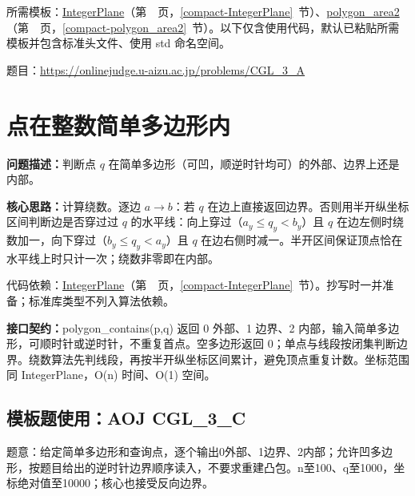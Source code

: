 所需模板：\hyperref[compact-IntegerPlane]{IntegerPlane}（第~\pageref{compact-IntegerPlane}~页，\ref{compact-IntegerPlane}~节）、\hyperref[compact-polygon_area2]{polygon\_\allowbreak{}area2}（第~\pageref{compact-polygon_area2}~页，\ref{compact-polygon_area2}~节）。以下仅含使用代码，默认已粘贴所需模板并包含标准头文件、使用 std 命名空间。

题目：\url{https://onlinejudge.u-aizu.ac.jp/problems/CGL_3_A}



\Needspace{500pt}

\section{点在整数简单多边形内}\label{compact-polygon_contains}

\noindent\textbf{问题描述：}\allowbreak 判断点 $q$ 在简单多边形（可凹，顺逆时针均可）的外部、边界上还是内部。

\textbf{核心思路：}\allowbreak 计算绕数。逐边 $a\to b$：若 $q$ 在边上直接返回边界。否则用半开纵坐标区间判断边是否穿过过 $q$ 的水平线：向上穿过（$a_y\le q_y<b_y$）且 $q$ 在边左侧时绕数加一，向下穿过（$b_y\le q_y<a_y$）且 $q$ 在边右侧时减一。半开区间保证顶点恰在水平线上时只计一次；绕数非零即在内部。

代码依赖：\hyperref[compact-IntegerPlane]{IntegerPlane}（第~\pageref{compact-IntegerPlane}~页，\ref{compact-IntegerPlane}~节）。抄写时一并准备；标准库类型不列入算法依赖。

{\sloppy{}\noindent\textbf{接口契约：}polygon\_contains(p,q) 返回 0 外部、1 边界、2 内部，输入简单多边形，可顺时针或逆时针，不重复首点。空多边形返回 0；单点与线段按闭集判断边界。绕数算法先判线段，再按半开纵坐标区间累计，避免顶点重复计数。坐标范围同 IntegerPlane，O(n) 时间、O(1) 空间。\par}



\Needspace{347pt}

\subsection*{模板题使用：AOJ CGL\_3\_C}

\label{usage-example-135}

题意：给定简单多边形和查询点，逐个输出0外部、1边界、2内部；允许凹多边形，按题目给出的逆时针边界顺序读入，不要求重建凸包。n至100、q至1000，坐标绝对值至10000；核心也接受反向边界。

